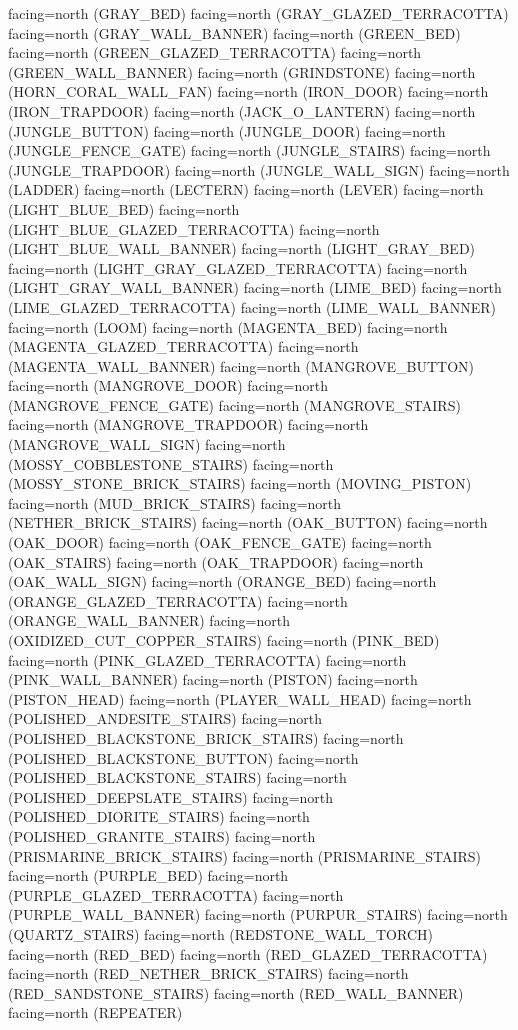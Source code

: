 \documentclass[11pt]{article}
\begin{document}
facing=north (GRAY_BED)
facing=north (GRAY_GLAZED_TERRACOTTA)
facing=north (GRAY_WALL_BANNER)
facing=north (GREEN_BED)
facing=north (GREEN_GLAZED_TERRACOTTA)
facing=north (GREEN_WALL_BANNER)
facing=north (GRINDSTONE)
facing=north (HORN_CORAL_WALL_FAN)
facing=north (IRON_DOOR)
facing=north (IRON_TRAPDOOR)
facing=north (JACK_O_LANTERN)
facing=north (JUNGLE_BUTTON)
facing=north (JUNGLE_DOOR)
facing=north (JUNGLE_FENCE_GATE)
facing=north (JUNGLE_STAIRS)
facing=north (JUNGLE_TRAPDOOR)
facing=north (JUNGLE_WALL_SIGN)
facing=north (LADDER)
facing=north (LECTERN)
facing=north (LEVER)
facing=north (LIGHT_BLUE_BED)
facing=north (LIGHT_BLUE_GLAZED_TERRACOTTA)
facing=north (LIGHT_BLUE_WALL_BANNER)
facing=north (LIGHT_GRAY_BED)
facing=north (LIGHT_GRAY_GLAZED_TERRACOTTA)
facing=north (LIGHT_GRAY_WALL_BANNER)
facing=north (LIME_BED)
facing=north (LIME_GLAZED_TERRACOTTA)
facing=north (LIME_WALL_BANNER)
facing=north (LOOM)
facing=north (MAGENTA_BED)
facing=north (MAGENTA_GLAZED_TERRACOTTA)
facing=north (MAGENTA_WALL_BANNER)
facing=north (MANGROVE_BUTTON)
facing=north (MANGROVE_DOOR)
facing=north (MANGROVE_FENCE_GATE)
facing=north (MANGROVE_STAIRS)
facing=north (MANGROVE_TRAPDOOR)
facing=north (MANGROVE_WALL_SIGN)
facing=north (MOSSY_COBBLESTONE_STAIRS)
facing=north (MOSSY_STONE_BRICK_STAIRS)
facing=north (MOVING_PISTON)
facing=north (MUD_BRICK_STAIRS)
facing=north (NETHER_BRICK_STAIRS)
facing=north (OAK_BUTTON)
facing=north (OAK_DOOR)
facing=north (OAK_FENCE_GATE)
facing=north (OAK_STAIRS)
facing=north (OAK_TRAPDOOR)
facing=north (OAK_WALL_SIGN)
facing=north (ORANGE_BED)
facing=north (ORANGE_GLAZED_TERRACOTTA)
facing=north (ORANGE_WALL_BANNER)
facing=north (OXIDIZED_CUT_COPPER_STAIRS)
facing=north (PINK_BED)
facing=north (PINK_GLAZED_TERRACOTTA)
facing=north (PINK_WALL_BANNER)
facing=north (PISTON)
facing=north (PISTON_HEAD)
facing=north (PLAYER_WALL_HEAD)
facing=north (POLISHED_ANDESITE_STAIRS)
facing=north (POLISHED_BLACKSTONE_BRICK_STAIRS)
facing=north (POLISHED_BLACKSTONE_BUTTON)
facing=north (POLISHED_BLACKSTONE_STAIRS)
facing=north (POLISHED_DEEPSLATE_STAIRS)
facing=north (POLISHED_DIORITE_STAIRS)
facing=north (POLISHED_GRANITE_STAIRS)
facing=north (PRISMARINE_BRICK_STAIRS)
facing=north (PRISMARINE_STAIRS)
facing=north (PURPLE_BED)
facing=north (PURPLE_GLAZED_TERRACOTTA)
facing=north (PURPLE_WALL_BANNER)
facing=north (PURPUR_STAIRS)
facing=north (QUARTZ_STAIRS)
facing=north (REDSTONE_WALL_TORCH)
facing=north (RED_BED)
facing=north (RED_GLAZED_TERRACOTTA)
facing=north (RED_NETHER_BRICK_STAIRS)
facing=north (RED_SANDSTONE_STAIRS)
facing=north (RED_WALL_BANNER)
facing=north (REPEATER)
\end{document}
